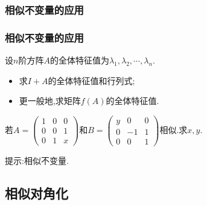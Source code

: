 \subsubsection{相似不变量的应用}
\begin{frame}\frametitle{相似不变量的应用}
\begin{example}
设$n$阶方阵$A$的全体特征值为$\lambda_1,\lambda_2,\cdots,\lambda_n$.
\pp
\begin{itemize}
\item 求$I+A$的全体特征值和行列式;
\pp
\item 更一般地,求矩阵$f(A)$的全体特征值.
\end{itemize}
\end{example}
\pp
{}

\pp
\begin{example}
若$A=\begin{pmatrix}1&0&0\\0&0&1\\0&1&x\end{pmatrix}$和$B=\begin{pmatrix}y&0&0\\0&-1&1\\0&0&1\end{pmatrix}$相似.求$x,y$.
\end{example}
\pp
提示:相似不变量.
\end{frame}



\subsection{相似对角化}

